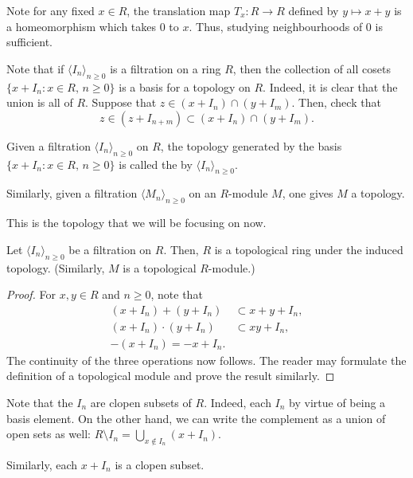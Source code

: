 \documentclass[12pt]{article}
\begin{document}
Note for any fixed $x \in R$, the translation map $T_{x} : R \to R$ defined by $y \mapsto x + y$ is a homeomorphism which takes $0$ to $x$. Thus, studying neighbourhoods of $0$ is sufficient.

Note that if $\langle I_{n} \rangle_{n \ge 0}$ is a filtration on a ring $R$, then the collection of all cosets $\{x + I_{n} : x \in R,\, n \ge 0\}$ is a basis for a topology on $R$. Indeed, it is clear that the union is all of $R$. Suppose that $z \in (x + I_{n}) \cap (y + I_{m})$. Then, check that
\begin{equation*} 
	z \in (z + I_{n + m}) \subset (x + I_{n}) \cap (y + I_{m}).
\end{equation*}

\begin{defn}
	Given a filtration $\langle I_{n} \rangle_{n \ge 0}$ on $R$, the topology generated by the basis $\{x + I_{n} : x \in R,\, n \ge 0\}$ is called the  by $\langle I_{n} \rangle_{n \ge 0}$.

	Similarly, given a filtration $\langle M_{n} \rangle_{n \ge 0}$ on an $R$-module $M$, one gives $M$ a topology.
\end{defn}

This is the topology that we will be focusing on now.

\begin{prop}
	Let $\langle I_{n} \rangle_{n \ge 0}$ be a filtration on $R$. Then, $R$ is a topological ring under the induced topology. (Similarly, $M$ is a topological $R$-module.)
\end{prop}
\begin{proof} 
	For $x, y \in R$ and $n \ge 0$, note that
	\begin{align*} 
		(x + I_{n}) + (y + I_{n}) &\subset x + y + I_{n}, \\
		(x + I_{n}) \cdot (y + I_{n}) &\subset xy + I_{n}, \\
		-(x + I_{n}) = -x + I_{n}.
	\end{align*}
	The continuity of the three operations now follows. The reader may formulate the definition of a topological module and prove the result similarly.
\end{proof}

\begin{obs}
	Note that the $I_{n}$ are clopen subsets of $R$. Indeed, each $I_{n}$ by virtue of being a basis element. On the other hand, we can write the complement as a union of open sets as well: $R \setminus I_{n} = \bigcup_{x \notin I_{n}} (x + I_{n})$. 

	Similarly, each $x + I_{n}$ is a clopen subset.
\end{obs}
\end{document}
